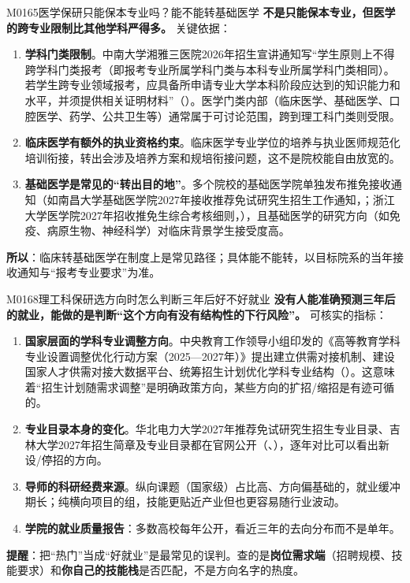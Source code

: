 \begin{qa}{M0165}{医学保研只能保本专业吗？能不能转基础医学}
\textbf{不是只能保本专业，但医学的跨专业限制比其他学科严得多。} 关键依据：
\begin{enumerate}
  \item \textbf{学科门类限制}。中南大学湘雅三医院2026年招生宣讲通知写“学生原则上不得跨学科门类报考（即报考专业所属学科门类与本科专业所属学科门类相同）。若学生跨专业领域报考，应具备所申请专业大学本科阶段应达到的知识能力和水平，并须提供相关证明材料”（）。医学门类内部（临床医学、基础医学、口腔医学、药学、公共卫生等）通常属于可讨论范围，跨到理工科门类则受限。
  \item \textbf{临床医学有额外的执业资格约束}。临床医学专业学位的培养与执业医师规范化培训衔接，转出会涉及培养方案和规培衔接问题，这不是院校能自由放宽的。
  \item \textbf{基础医学是常见的“转出目的地”}。多个院校的基础医学院单独发布推免接收通知（如南昌大学基础医学院2027年接收推荐免试研究生招生工作通知，；浙江大学医学院2027年招收推免生综合考核细则，），且基础医学的研究方向（如免疫、病原生物、神经科学）对临床背景学生接受度高。
\end{enumerate}
\textbf{所以}：临床转基础医学在制度上是常见路径；具体能不能转，以目标院系的当年接收通知与“报考专业要求”为准。
\end{qa}

\begin{qa}{M0168}{理工科保研选方向时怎么判断三年后好不好就业}
\textbf{没有人能准确预测三年后的就业，能做的是判断“这个方向有没有结构性的下行风险”。}
可核实的指标：
\begin{enumerate}
  \item \textbf{国家层面的学科专业调整方向}。中央教育工作领导小组印发的《高等教育学科专业设置调整优化行动方案（2025—2027年）》提出建立供需对接机制、建设国家人才供需对接大数据平台、统筹招生计划优化学科专业结构（）。这意味着“招生计划随需求调整”是明确政策方向，某些方向的扩招/缩招是有迹可循的。
  \item \textbf{专业目录本身的变化}。华北电力大学2027年推荐免试研究生招生专业目录、吉林大学2027年招生简章及专业目录都在官网公开（、），逐年对比可以看出新设/停招的方向。
  \item \textbf{导师的科研经费来源}。纵向课题（国家级）占比高、方向偏基础的，就业缓冲期长；纯横向项目的组，技能更贴近产业但也更容易随行业波动。
  \item \textbf{学院的就业质量报告}：多数高校每年公开，看近三年的去向分布而不是单年。
\end{enumerate}
\textbf{提醒}：把“热门”当成“好就业”是最常见的误判。查的是\textbf{岗位需求端}（招聘规模、技能要求）和\textbf{你自己的技能栈}是否匹配，不是方向名字的热度。
\end{qa}

